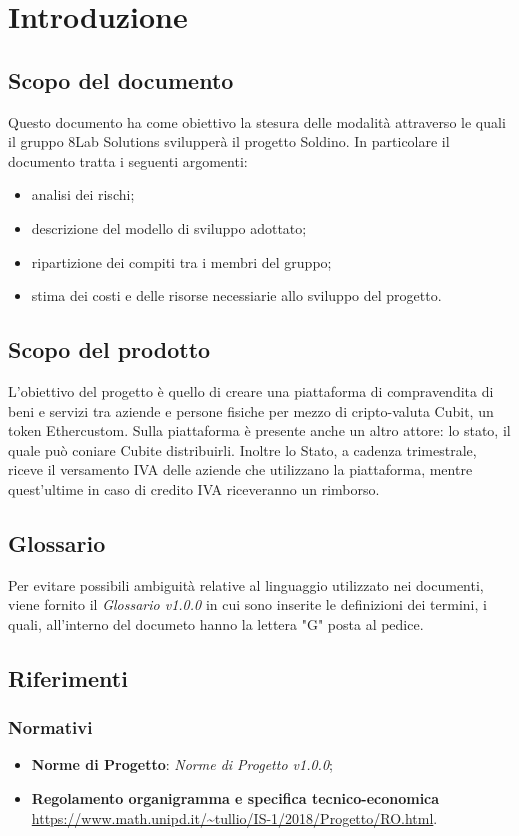 \section{Introduzione}
\subsection{Scopo del documento}
Questo documento ha come obiettivo la stesura delle modalità attraverso le quali il gruppo 8Lab Solutions svilupperà il progetto Soldino. In particolare il documento tratta i seguenti argomenti:
\begin{itemize}
	\item analisi dei rischi;
	\item descrizione del modello di sviluppo adottato;
	\item ripartizione dei compiti tra i membri del gruppo;
	\item stima dei costi e delle risorse necessiarie allo sviluppo del progetto.
\end{itemize}
\subsection{Scopo del prodotto}
L'obiettivo del progetto è quello di creare una piattaforma di compravendita di beni e servizi tra aziende e persone fisiche per mezzo di cripto-valuta Cubit\glo, un token Ether\glosp custom. Sulla piattaforma è presente anche un altro attore: lo stato, il quale può coniare Cubit\glosp e distribuirli. Inoltre lo Stato, a cadenza trimestrale, riceve il versamento IVA delle aziende che utilizzano la piattaforma, mentre quest'ultime in caso di credito IVA riceveranno un rimborso.
\subsection{Glossario}
Per evitare possibili ambiguità relative al linguaggio utilizzato nei 
documenti, viene fornito il \textit{Glossario v1.0.0} in cui sono inserite le 
definizioni dei termini, i quali, all'interno del documeto hanno la lettera "G" 
posta al pedice.
\subsection{Riferimenti}
\subsubsection{Normativi}
\begin{itemize}
	\item \textbf{Norme di Progetto}: \textit{Norme di Progetto v1.0.0};
	\item \textbf{Regolamento organigramma e specifica tecnico-economica} \\
	\url{https://www.math.unipd.it/~tullio/IS-1/2018/Progetto/RO.html}.
\end{itemize}


